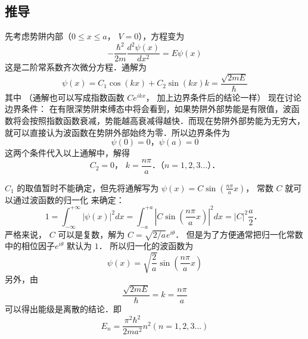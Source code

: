 \subsection{推导} 
先考虑势阱内部（$0 \le x \le a$，  $V = 0$），方程变为
\begin{equation}
- \frac{{{\hbar ^2}}}{{2m}}\frac{{{d^2}\psi \left( x \right)}}{{d{x^2}}} = E\psi \left( x \right) 
\end{equation}
这是二阶常系数齐次微分方程．通解为
\begin{equation}
\psi \left( x \right) = {C_1}\cos \left( {kx} \right) + {C_2}\sin \left( {kx} \right) 
 k = \frac{{\sqrt {2mE} }}{\hbar }
\end{equation} 
其中
（通解也可以写成指数函数 $C{e^{ikx}}$， 加上边界条件后的结论一样）
现在讨论边界条件： 在有限深势阱束缚态中将会看到，如果势阱外部势能是有限值，波函数将会按照指数函数衰减，势能越高衰减得越快．而现在势阱外部势能为无穷大，就可以直接认为波函数在势阱外部始终为零．所以边界条件为
 \begin{equation}
\psi \left( 0 \right) = 0 \text{，}\psi \left( a \right) = 0
\end{equation}
这两个条件代入以上通解中，解得
\begin{equation}
{C_2} = 0\text{， } k = \frac{{n\pi }}{a} \text{．（} n = 1,2,3... \text{）．}
\end{equation}

 ${C_1}$ 的取值暂时不能确定，但先将通解写为 $\psi \left( x \right) = C\sin \left( {\frac{{n\pi }}{a}x} \right)$， 常数 $C$ 就可以通过波函数的归一化%
 来确定：
 \begin{equation}
1 = \int_{ - \infty }^{ + \infty } {{{\left| {\psi \left( x \right)} \right|}^2}dx}  = \int_{ - a}^{ + a} {{{\left| {C\sin \left( {\frac{{n\pi }}{a}x} \right)} \right|}^2}dx}  = {\left| C \right|^2}\frac{a}{2}\text{．  }
\end{equation}
严格来说， $C$ 可以是复数，解为 $C = \sqrt {{2}/{a}} {e^{i\theta }}$． 但是为了方便通常把归一化常数中的相位因子${e^{i\theta }}$ 默认为 $1$． 所以归一化的波函数为
 \begin{equation}
\psi \left( x \right) = \sqrt {\frac{2}{a}} \sin \left( {\frac{{n\pi }}{a}x} \right)
\end{equation}
另外，由
\begin{equation}
\frac{{\sqrt {2mE} }}{\hbar } = k = \frac{{n\pi }}{a}
\end{equation}
可以得出能级是离散的结论．即
 \begin{equation}
{E_n} = \frac{{{\pi ^2}{\hbar ^2}}}{{2m{a^2}}}{n^2} \left( {n = 1,2,3...} \right)
\end{equation}

